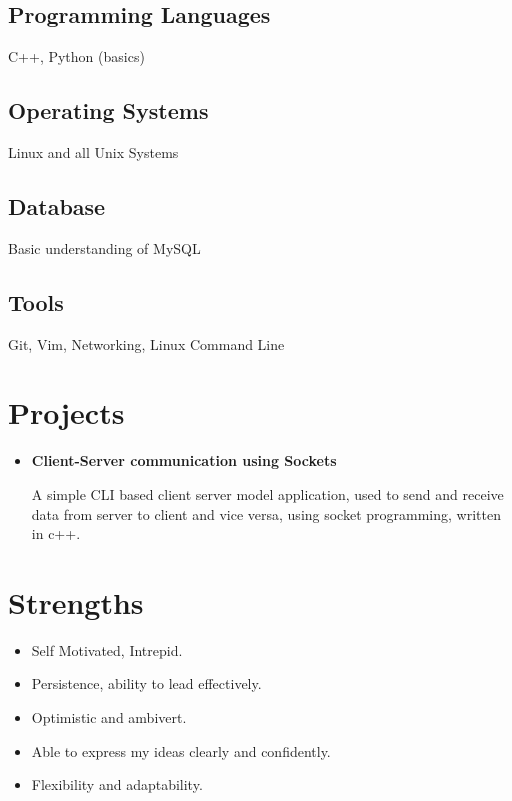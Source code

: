 \documentclass[11pt]{article}
\begin{document}
\subsection{Programming Languages}
C++, Python (basics)

\subsection{Operating Systems}
Linux and all Unix Systems

\subsection{Database}
Basic understanding of MySQL

\subsection{Tools}
Git, Vim, Networking, Linux Command Line

\section{Projects}

\begin{itemize}[leftmargin=1mm]
\item[] {\bfseries Client-Server communication using Sockets}

A simple CLI based client server model application, used to send and receive data from
server to client and vice versa, using socket programming, written in c++.

\end{itemize}

\section{Strengths}

\begin{itemize}[leftmargin=3mm]

\item Self Motivated, Intrepid.
\item Persistence, ability to lead effectively.
\item Optimistic and ambivert.
\item Able to express my ideas clearly and confidently.
\item Flexibility and adaptability.

\end{itemize}
\end{document}
